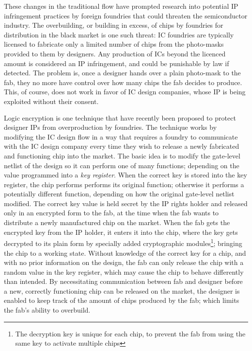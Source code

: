 These changes in the traditional flow have prompted research into potential IP infringement practices by foreign foundries that could threaten the semiconductor industry. The overbuilding, or building in excess, of chips by foundries for distribution in the black market is one such threat: IC foundries are typically licensed to fabricate only a limited number of chips from the photo-masks provided to them by designers. Any production of ICs beyond the licenced amount is considered an IP infringement, and could be punishable by law if detected. The problem is, once a designer hands over a plain photo-mask to the fab, they no more have control over how many chips the fab decides to produce. This, of course, does not work in favor of IC design companies, whose IP is being exploited without their consent. 

Logic encryption is one technique that have recently been proposed to protect designer IPs from overproduction by foundries. The technique works by modifying the IC design flow in a way that requires a foundry to communicate with the IC design company every time they wish to release a newly fabricated and functioning chip into the market. The basic idea is to modify the gate-level netlist of the design so it 
can perform one of many functions; depending on the value programmed into a \emph{key register}. When the correct key is stored into the key register, the chip performs performs its original function; otherwise it performs a potentially different function, depending on how the original gate-level netlist modified. The correct key value is held secret by the IP rights holder and released only in an encrypted form to the fab, at the time when the fab wants to distribute a newly manufactured chip on the market. When the fab gets the encrypted key from the IP holder, it enters it into the chip, where the key gets decrypted to its plain form by specially added cryptographic modules\footnote{The decryption key is unique for each chip, to prevent the fab from using the same key to activate multiple chips}; bringing the chip to a working state.
Without knowledge of the correct key for a chip, and with no prior information on the design, the fab can only release the chip with a random value in the key register, which may cause the chip to behave differently than intended. By necessitating communication between fab and designer before a new, correctly functioning chip can be released on the market, the designer is enabled to keep track of the amount of chips produced by the fab; which limits the fab's ability to overbuild. 

